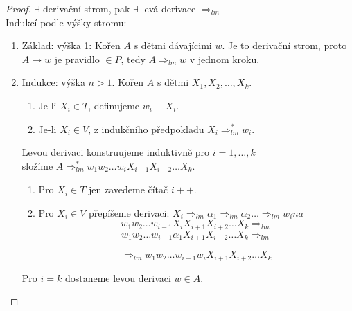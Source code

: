 \documentclass[../main.tex]{subfiles}
\begin{document}
\begin{proof}
    $\exists$ derivační strom, pak $\exists$ levá derivace $\Rightarrow_{lm}$\\

    Indukcí podle výšky stromu:
    \begin{enumerate}
        \item Základ: výška 1: Kořen $A$ s dětmi dávajícimi $w$. Je to derivační strom, proto
        $A \rightarrow w$ je pravidlo $\in P$, tedy $A \Rightarrow_{lm} w$ v jednom kroku.
        \item Indukce: výška $n > 1$. Kořen $A$ s dětmi $X_1,X_2,\dots,X_k$.
        \begin{enumerate}
            \item Je-li $X_i \in T$, definujeme $w_i \equiv X_i$.
            \item Je-li $X_i \in V$, z indukčního předpokladu $X_i \Rightarrow^*_{lm}w_i$.
        \end{enumerate}

        Levou derivaci konstruujeme induktivně pro $i = 1,\dots,k$\\
        složíme $A \Rightarrow^*_{lm}w_1w_2 \dots w_i X_{i+1}X_{i+2}\dots X_k$.
        \begin{enumerate}
            \item Pro $X_i \in T$ jen zavedeme čítač $i + +$.
            \item Pro $X_i \in V$ přepíšeme derivaci: $X_i\Rightarrow_{lm} \alpha_1 \Rightarrow_{lm} \alpha_2\dots \Rightarrow_{lm}w_i na$
            \[w_1w_2\dots w_{i-1}X_iX_{i+1}X_{i+2}\dots X_k \Rightarrow_{lm}\]
            \[w_1w_2\dots w_{i-1}\alpha_1X_{i+1}X_{i+2}\dots X_k \Rightarrow_{lm}\]


            \[\Rightarrow_{lm} w_1w_2\dots w_{i-1}w_i X_{i+1}X_{i+2}\dots X_k\]                
        \end{enumerate}

        Pro $i = k$ dostaneme levou derivaci $w \in A$.
    \end{enumerate}
\end{proof}
\end{document}

